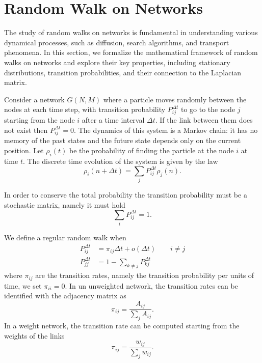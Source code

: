 \section{Random Walk on Networks}

The study of random walks on networks is fundamental in understanding various dynamical processes, such as diffusion, search algorithms, and transport phenomena. In this section, we formalize the mathematical framework of random walks on networks and explore their key properties, including stationary distributions, transition probabilities, and their connection to the Laplacian matrix.

Consider a network $G(N,M)$ where a particle moves randomly between the nodes at each time step, with transition probability $P_{ij}^{\Delta t}$ to go to the node $j$ starting from the node $i$ after a time interval $\Delta t$. If the link between them does not exist then $P_{ij}^{\Delta t}= 0$. 
The dynamics of this system is a Markov chain: it has no memory of the past states and the future state depends only on the current position.
Let $\rho_i(t)$ be the probability of finding the particle at the node $i$ at time $t$. The discrete time evolution of the system is given by the law
\begin{equation}\label{discrite random walk}
    \rho_i(n+\Delta t) = \sum_j P_{ij}^{\Delta t}\rho_j(n).
\end{equation}

In order to conserve the total probability the transition probability must be a stochastic matrix, namely it must hold 
\begin{equation}
    \sum_i P_{ij}^{\Delta t} = 1 .
\end{equation}

We define a regular random walk when
\begin{align}
    P^{\Delta t}_{ij}&=\pi_{ij}\Delta t + o(\Delta t) \qquad i\ne j\\
    P^{\Delta t}_{jj}&=1-\sum_{k\ne j}P^{\Delta t}_{kj}
\end{align}
where $\pi_{ij}$ are the transition rates, namely the transition probability per units of time, we set $\pi_{ii}=0$.
In un unweighted network, the transition rates can be identified with the adjacency matrix as
\begin{equation}\label{transition_rates}
    \pi_{ij} = \frac{A_{ij}}{\sum_j A_{ij}}.
\end{equation}
In a weight network, the transition rate can be computed starting from the weights of the links
\begin{equation}
    \pi_{ij} = \frac{w_{ij}}{\sum_j w_{ij}}.
\end{equation}

